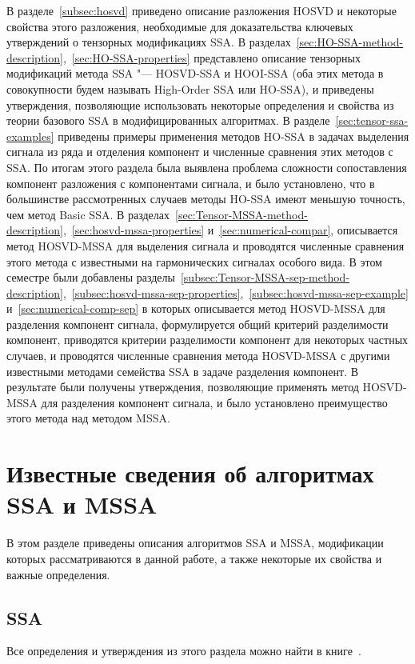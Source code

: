 \documentclass[specialist,
    substylefile = spbu.rtx,
    subf,href,colorlinks=true, 12pt]{disser}
\theoremstyle{plain}
\theoremstyle{definition}
\theoremstyle{remark}
\begin{document}
    В разделе~\ref{subsec:hosvd} приведено описание разложения HOSVD и некоторые свойства этого разложения,
    необходимые для доказательства ключевых утверждений о тензорных модификациях SSA.
    В разделах~\ref{sec:HO-SSA-method-description},~\ref{sec:HO-SSA-properties} представлено описание
    тензорных модификаций метода SSA "--- HOSVD-SSA и HOOI-SSA (оба этих метода в совокупности будем называть
    High-Order SSA или HO-SSA), и приведены утверждения, позволяющие использовать некоторые определения и
    свойства из теории базового SSA в модифицированных алгоритмах.
    В разделе~\ref{sec:tensor-ssa-examples} приведены примеры применения методов HO-SSA в задачах выделения сигнала
    из ряда и отделения компонент и численные сравнения этих методов с SSA. По итогам этого раздела была
    выявлена проблема сложности сопоставления компонент разложения с компонентами сигнала, и было установлено,
    что в большинстве рассмотренных случаев методы HO-SSA имеют меньшую точность, чем метод Basic SSA.
    В разделах~\ref{sec:Tensor-MSSA-method-description},~\ref{sec:hosvd-mssa-properties} и~\ref{sec:numerical-compar},
    описывается метод HOSVD-MSSA для выделения сигнала и проводятся численные сравнения этого метода
    с известными на гармонических сигналах особого вида.
    В этом семестре были добавлены разделы~\ref{subsec:Tensor-MSSA-sep-method-description},~\ref{subsec:hosvd-mssa-sep-properties},~\ref{subsec:hosvd-mssa-sep-example} 
    и~\ref{sec:numerical-comp-sep} в которых описывается метод HOSVD-MSSA для
    разделения компонент сигнала, формулируется общий критерий разделимости компонент, приводятся критерии
    разделимости компонент для некоторых частных случаев, и проводятся численные сравнения метода HOSVD-MSSA
    с другими известными методами семейства SSA в задаче разделения компонент.
    В результате были получены утверждения, позволяющие применять метод HOSVD-MSSA для 
    разделения компонент сигнала, и было установлено преимущество этого метода над методом MSSA.
    \newpage


    \section{Известные сведения об алгоритмах SSA и MSSA}\label{sec:known-results-ssa}
    В этом разделе приведены описания алгоритмов SSA и MSSA, модификации которых рассматриваются в данной работе,
    а также некоторые их свойства и важные определения.
    
    
    \subsection{SSA}\label{subsec:ssa}
    Все определения и утверждения из этого раздела можно найти в книге~\cite{ssa}.
    
\end{document}
